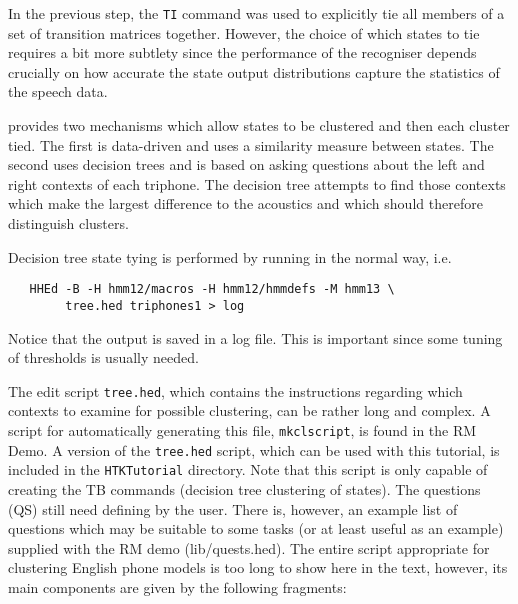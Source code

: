 In the previous step, the \texttt{TI} command was used to
explicitly tie all members of a set of transition matrices together. 
However,
the choice of which states to tie requires a bit more  subtlety since
the performance of the recogniser depends crucially on how accurate
the state output distributions capture the statistics of the speech data.

 provides two mechanisms which allow states to be clustered 
and
then each cluster tied.  The first is data-driven and uses a similarity
measure between states.  The second uses decision trees
and is based on asking questions about the left and right contexts of each
triphone.  The decision tree attempts to find those contexts which make the largest
difference to the acoustics and which should therefore distinguish clusters.

Decision tree state tying is performed by running  
in the normal way, i.e.
\begin{verbatim}
   HHEd -B -H hmm12/macros -H hmm12/hmmdefs -M hmm13 \
        tree.hed triphones1 > log
\end{verbatim}
Notice that the output is saved in a log file.  This is important since
some tuning of thresholds is usually needed.

The edit script \texttt{tree.hed}, which contains the instructions regarding
which contexts to examine for possible clustering, can be rather long and
complex. A script for automatically generating this file, \texttt{mkclscript},
is found in the RM Demo. A version of the \texttt{tree.hed} script, which can
be used with this tutorial, is included in the \texttt{HTKTutorial} directory.
Note that this script is only capable of creating the TB commands (decision 
tree clustering of states).  The questions (QS) still need defining by
the user.  There is, however, an example list of questions which may be 
suitable to some tasks (or at least useful as an example) supplied with the 
RM demo (lib/quests.hed).  The entire script appropriate for clustering 
English phone models is too long to show here in the text, however, its main 
components are given by the following fragments:


